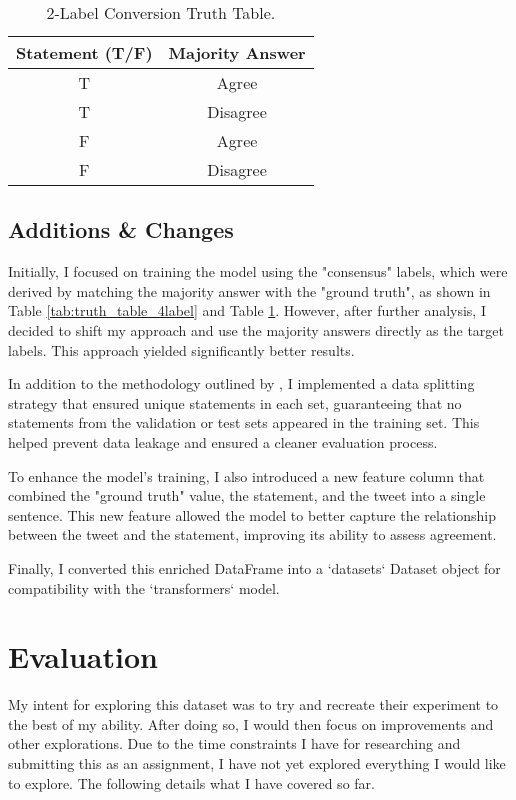 \documentclass[14]{article}
\begin{document}
\begin{table}[h!]
    \centering
    \begin{tabular}{|c|c|}
    \hline
    \textbf{Statement (T/F)} & \textbf{Majority Answer} \\
    \hline
    T & Agree \\
    T & Disagree \\
    F & Agree \\
    F & Disagree \\
    \hline
    \end{tabular}
    \caption{2-Label Conversion Truth Table.}
    \label{tab:truth_table_2label}
\end{table}

\subsection{Additions \& Changes}

Initially, I focused on training the model using the "consensus" labels, which were derived by matching the majority answer with the "ground truth", as shown in Table \ref{tab:truth_table_4label} and Table \ref{tab:truth_table_2label}. However, after further analysis, I decided to shift my approach and use the majority answers directly as the target labels. This approach yielded significantly better results.

In addition to the methodology outlined by \citet{truthseeker}, I implemented a data splitting strategy that ensured unique statements in each set, guaranteeing that no statements from the validation or test sets appeared in the training set. This helped prevent data leakage and ensured a cleaner evaluation process.

To enhance the model's training, I also introduced a new feature column that combined the "ground truth" value, the statement, and the tweet into a single sentence. This new feature allowed the model to better capture the relationship between the tweet and the statement, improving its ability to assess agreement.

Finally, I converted this enriched DataFrame into a `datasets` Dataset object for compatibility with the `transformers` model.

\section{Evaluation}

My intent for exploring this dataset \cite{truthseeker} was to try and recreate their experiment to the best of my ability. After doing so, I would then focus on improvements and other explorations. Due to the time constraints I have for researching and submitting this as an assignment, I have not yet explored everything I would like to explore. The following details what I have covered so far.
\end{document}
